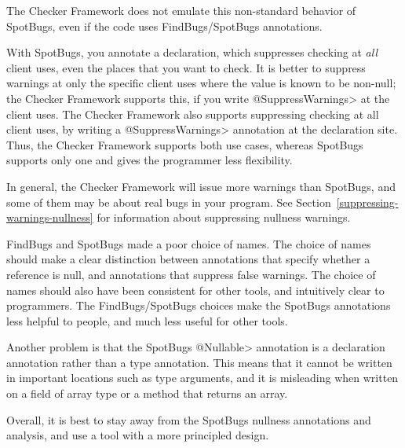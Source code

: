 \noindent
The Checker Framework does not emulate this non-standard behavior of
SpotBugs, even if the code uses FindBugs/SpotBugs annotations.

With SpotBugs, you annotate a declaration, which suppresses checking at
\emph{all} client uses, even the places that you want to check.
It is better to suppress warnings at only the specific client uses
where the value is known to be non-null; the Checker Framework supports
this, if you write \<@SuppressWarnings> at the client uses.
The Checker Framework also supports suppressing checking at all client uses,
by writing a \<@SuppressWarnings> annotation at the declaration site.
Thus, the Checker Framework supports both use cases, whereas SpotBugs
supports only one and gives the programmer less flexibility.

In general, the Checker Framework will issue more warnings than SpotBugs,
and some of them may be about real bugs in your program.
See Section~\ref{suppressing-warnings-nullness} for information about
suppressing nullness warnings.

FindBugs and SpotBugs made a poor choice of names.  The choice of names should make a
clear distinction between annotations that specify whether a reference is
null, and annotations that suppress false warnings.  The choice of names
should also have been consistent for other tools, and intuitively clear to
programmers.  The FindBugs/SpotBugs choices make the SpotBugs annotations less
helpful to people, and much less useful for other tools.

Another problem is that the SpotBugs \<@Nullable> annotation is a
declaration annotation rather than a type annotation.  This means that it
cannot be written in important locations such as type arguments, and it is
misleading when written on a field of array type or a method that returns
an array.

Overall, it is best to stay away from the SpotBugs nullness annotations and
analysis, and use a tool with a more principled design.


